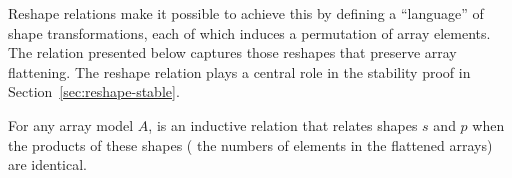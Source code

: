 Reshape relations make it possible to achieve this by defining a ``language'' of
shape transformations, each of which induces a permutation of array elements.
The relation presented below captures those reshapes that preserve array
flattening. The reshape relation plays a central role in the stability proof in
Section~\ref{sec:reshape-stable}.

For any array model $A$,  is an inductive relation that relates
shapes $s$ and $p$ when the products of these shapes (\ie{} the numbers of
elements in the flattened arrays) are identical.
\begin{code}%
%
\>[2]\AgdaSpace{}%
\AgdaSpace{}%
\AgdaSymbol{:}\AgdaSpace{}%
\AgdaSpace{}%
\AgdaSpace{}%
\AgdaSpace{}%
\AgdaSpace{}%
\AgdaSpace{}%
\<%
\\
\>[2][@{}l@{\AgdaIndent{0}}]%
\>[4]%
\>[11]\AgdaSymbol{:}\AgdaSpace{}%
\AgdaSpace{}%
\AgdaSpace{}%
\<%
\\
%
\>[4]%
\>[11]\AgdaSymbol{:}\AgdaSpace{}%
\AgdaSpace{}%
\AgdaSpace{}%
\AgdaSpace{}%
\AgdaSpace{}%
\AgdaSpace{}%
\AgdaSpace{}%
\AgdaSpace{}%
\AgdaSpace{}%
\AgdaSpace{}%
\AgdaSymbol{(}\AgdaSpace{}%
\AgdaSpace{}%
\AgdaSymbol{)}\AgdaSpace{}%
\AgdaSymbol{(}\AgdaSpace{}%
\AgdaSpace{}%
\AgdaSymbol{)}\<%
\\
%
\>[4]%
\>[11]\AgdaSymbol{:}\AgdaSpace{}%
\AgdaSpace{}%
\AgdaSpace{}%
\AgdaSpace{}%
\AgdaSpace{}%
\AgdaSpace{}%
\AgdaSpace{}%
\AgdaSpace{}%
\AgdaSpace{}%
\AgdaSpace{}%
\AgdaSpace{}%
\<%
\\
%
\>[4]%
\>[11]\AgdaSymbol{:}\AgdaSpace{}%
\AgdaSpace{}%
\AgdaSymbol{(}\AgdaSpace{}%

\end{code}
